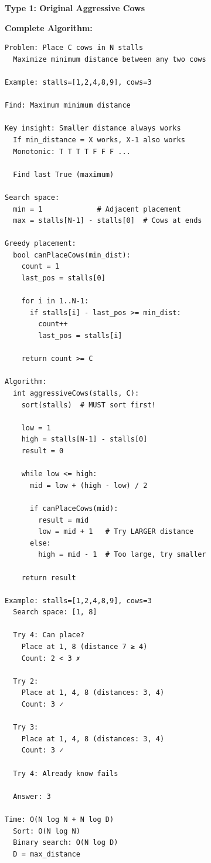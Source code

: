 \documentclass[11pt,a4paper,oneside]{book}
\begin{document}
\begin{tcolorbox}[
    enhanced,breakable,
    colback=successgreen!10,
    colframe=successgreen,
    boxrule=1.5pt,
    arc=3mm,
    title=\textbf{Complete Aggressive Cows Algorithms}
]
\textbf{Type 1: Original Aggressive Cows}

\textbf{Complete Algorithm:}
\begin{verbatim}
Problem: Place C cows in N stalls
  Maximize minimum distance between any two cows
  
Example: stalls=[1,2,4,8,9], cows=3
  
Find: Maximum minimum distance

Key insight: Smaller distance always works
  If min_distance = X works, X-1 also works
  Monotonic: T T T T F F F ...
  
  Find last True (maximum)

Search space:
  min = 1             # Adjacent placement
  max = stalls[N-1] - stalls[0]  # Cows at ends

Greedy placement:
  bool canPlaceCows(min_dist):
    count = 1
    last_pos = stalls[0]
    
    for i in 1..N-1:
      if stalls[i] - last_pos >= min_dist:
        count++
        last_pos = stalls[i]
    
    return count >= C

Algorithm:
  int aggressiveCows(stalls, C):
    sort(stalls)  # MUST sort first!
    
    low = 1
    high = stalls[N-1] - stalls[0]
    result = 0
    
    while low <= high:
      mid = low + (high - low) / 2
      
      if canPlaceCows(mid):
        result = mid
        low = mid + 1   # Try LARGER distance
      else:
        high = mid - 1  # Too large, try smaller
    
    return result

Example: stalls=[1,2,4,8,9], cows=3
  Search space: [1, 8]
  
  Try 4: Can place?
    Place at 1, 8 (distance 7 ≥ 4)
    Count: 2 < 3 ✗
  
  Try 2:
    Place at 1, 4, 8 (distances: 3, 4)
    Count: 3 ✓
  
  Try 3:
    Place at 1, 4, 8 (distances: 3, 4)
    Count: 3 ✓
  
  Try 4: Already know fails
  
  Answer: 3

Time: O(N log N + N log D)
  Sort: O(N log N)
  Binary search: O(N log D)
  D = max_distance


\end{verbatim}
\end{tcolorbox}
\end{document}
